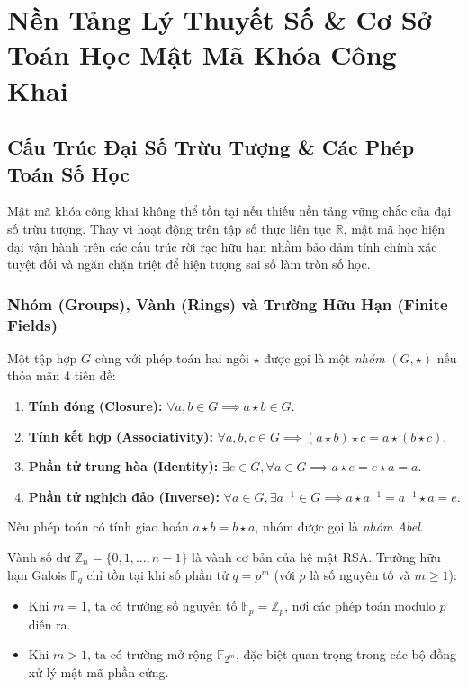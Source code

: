 \chapter{Nền Tảng Lý Thuyết Số \& Cơ Sở Toán Học Mật Mã Khóa Công Khai}


\section{Cấu Trúc Đại Số Trừu Tượng \& Các Phép Toán Số Học}

Mật mã khóa công khai không thể tồn tại nếu thiếu nền tảng vững chắc của đại số trừu tượng. Thay vì hoạt động trên tập số thực liên tục $\mathbb{R}$, mật mã học hiện đại vận hành trên các cấu trúc rời rạc hữu hạn nhằm bảo đảm tính chính xác tuyệt đối và ngăn chặn triệt để hiện tượng sai số làm tròn số học.

\subsection{Nhóm (Groups), Vành (Rings) và Trường Hữu Hạn (Finite Fields)}

\begin{definition}
Một tập hợp $G$ cùng với phép toán hai ngôi $\star$ được gọi là một \emph{nhóm} $(G, \star)$ nếu thỏa mãn 4 tiên đề:
\begin{enumerate}
  \item \textbf{Tính đóng (Closure):} $\forall a, b \in G \implies a \star b \in G$.
  \item \textbf{Tính kết hợp (Associativity):} $\forall a, b, c \in G \implies (a \star b) \star c = a \star (b \star c)$.
  \item \textbf{Phần tử trung hòa (Identity):} $\exists e \in G, \forall a \in G \implies a \star e = e \star a = a$.
  \item \textbf{Phần tử nghịch đảo (Inverse):} $\forall a \in G, \exists a^{-1} \in G \implies a \star a^{-1} = a^{-1} \star a = e$.
\end{enumerate}
Nếu phép toán có tính giao hoán $a \star b = b \star a$, nhóm được gọi là \emph{nhóm Abel}.
\Enddinhnghia
\end{definition}

Vành số dư $\mathbb{Z}_n = \{0, 1, \dots, n-1\}$ là vành cơ bản của hệ mật RSA. Trường hữu hạn Galois $\mathbb{F}_q$ chỉ tồn tại khi số phần tử $q = p^m$ (với $p$ là số nguyên tố và $m \ge 1$):
\begin{itemize}
  \item Khi $m = 1$, ta có trường số nguyên tố $\mathbb{F}_p = \mathbb{Z}_p$, nơi các phép toán modulo $p$ diễn ra.
  \item Khi $m > 1$, ta có trường mở rộng $\mathbb{F}_{2^m}$, đặc biệt quan trọng trong các bộ đồng xử lý mật mã phần cứng.
\end{itemize}

